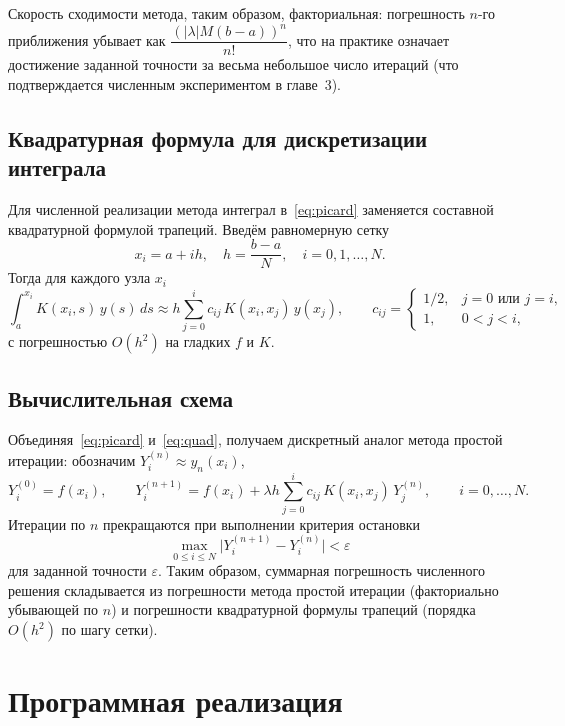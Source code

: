 \documentclass[a4paper,14pt]{extarticle}
\begin{document}
Скорость сходимости метода, таким образом, факториальная: погрешность $n$-го приближения убывает как $\dfrac{(|\lambda|M(b-a))^n}{n!}$, что на практике означает достижение заданной точности за весьма небольшое число итераций (что подтверждается численным экспериментом в главе~3).

\subsection{Квадратурная формула для дискретизации интеграла}

Для численной реализации метода интеграл в~\eqref{eq:picard} заменяется составной квадратурной формулой трапеций. Введём равномерную сетку
\[
x_i = a + i h, \quad h = \frac{b-a}{N}, \quad i = 0,1,\dots,N.
\]
Тогда для каждого узла $x_i$
\begin{equation}
\int_a^{x_i} K(x_i,s)\, y(s)\, ds \approx h \sum_{j=0}^{i} c_{ij}\, K(x_i,x_j)\, y(x_j),
\qquad
c_{ij} =
\begin{cases}
1/2, & j = 0 \text{ или } j = i,\\
1, & 0 < j < i,
\end{cases}
\label{eq:quad}
\end{equation}
с погрешностью $O(h^2)$ на гладких $f$ и $K$.

\subsection{Вычислительная схема}

Объединяя~\eqref{eq:picard} и~\eqref{eq:quad}, получаем дискретный аналог метода простой итерации: обозначим $Y_i^{(n)} \approx y_n(x_i)$,
\begin{equation}
Y_i^{(0)} = f(x_i), \qquad
Y_i^{(n+1)} = f(x_i) + \lambda h \sum_{j=0}^{i} c_{ij}\, K(x_i,x_j)\, Y_j^{(n)}, \qquad i = 0,\dots,N.
\label{eq:scheme}
\end{equation}
Итерации по $n$ прекращаются при выполнении критерия остановки
\[
\max_{0 \le i \le N} \bigl| Y_i^{(n+1)} - Y_i^{(n)} \bigr| < \varepsilon
\]
для заданной точности $\varepsilon$. Таким образом, суммарная погрешность численного решения складывается из погрешности метода простой итерации (факториально убывающей по $n$) и погрешности квадратурной формулы трапеций (порядка $O(h^2)$ по шагу сетки).

\section{Программная реализация}
\end{document}
